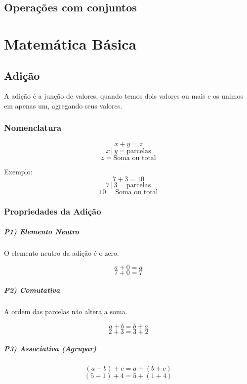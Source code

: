 \documentclass[letterpaper]{book}
\begin{document}
\section{Operações com conjuntos}

\chapter{Matemática Básica}

\section{Adição}

A adição é a junção de valores, quando temos dois valores ou mais e os unimos em apenas um, agregando seus valores.

\subsection{Nomenclatura}

\[ x + y = z \]
\[ x \,|\, y = \text{parcelas} \]
\[ z = \text{Soma ou total} \]

Exemplo:
\[ 7 + 3 = 10 \]
\[ 7 \,|\, 3 = \text{parcelas} \]
\[ 10 = \text{Soma ou total} \]

\subsection{Propriedades da Adição}

\paragraph{P1) Elemento Neutro}

O elemento neutro da adição é o zero.

\[ a + 0 = a \]
\[ 7 + 0 = 7 \]

\paragraph{P2) Comutativa}

A ordem das parcelas não altera a soma.

\[ a + b = b + a \]
\[ 2 + 3 = 3 + 2 \]

\paragraph{P3) Associativa (Agrupar)}

\[ (a + b) + c = a + (b + c) \]
\[ (5 + 1) + 4 = 5 + (1 + 4) \]
\end{document}

